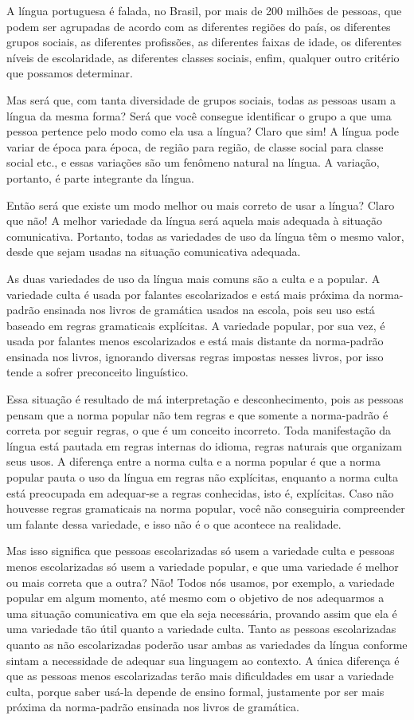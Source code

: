 A língua portuguesa é falada, no Brasil, por mais de 200 milhões de
pessoas, que podem ser agrupadas de acordo com as diferentes regiões do
país, os diferentes grupos sociais, as diferentes profissões, as
diferentes faixas de idade, os diferentes níveis de escolaridade, as
diferentes classes sociais, enfim, qualquer outro critério que possamos
determinar.

Mas será que, com tanta diversidade de grupos sociais, todas as pessoas
usam a língua da mesma forma? Será que você consegue identificar o grupo
a que uma pessoa pertence pelo modo como ela usa a língua? Claro que
sim! A língua pode variar de época para época, de região para região, de
classe social para classe social etc., e essas variações são um fenômeno
natural na língua. A variação, portanto, é parte integrante da língua.

Então será que existe um modo melhor ou mais correto de usar a língua?
Claro que não! A melhor variedade da língua será aquela mais adequada à
situação comunicativa. Portanto, todas as variedades de uso da língua
têm o mesmo valor, desde que sejam usadas na situação comunicativa
adequada.

As duas variedades de uso da língua mais comuns são a culta e a popular.
A variedade culta é usada por falantes escolarizados e está mais próxima
da norma-padrão ensinada nos livros de gramática usados na escola, pois
seu uso está baseado em regras gramaticais explícitas. A variedade
popular, por sua vez, é usada por falantes menos escolarizados e está
mais distante da norma-padrão ensinada nos livros, ignorando diversas
regras impostas nesses livros, por isso tende a sofrer preconceito
linguístico.

Essa situação é resultado de má interpretação e desconhecimento, pois as
pessoas pensam que a norma popular não tem regras e que somente a
norma-padrão é correta por seguir regras, o que é um conceito incorreto.
Toda manifestação da língua está pautada em regras internas do idioma,
regras naturais que organizam seus usos. A diferença entre a norma culta
e a norma popular é que a norma popular pauta o uso da língua em regras
não explícitas, enquanto a norma culta está preocupada em adequar-se a
regras conhecidas, isto é, explícitas. Caso não houvesse regras
gramaticais na norma popular, você não conseguiria compreender um
falante dessa variedade, e isso não é o que acontece na realidade.

Mas isso significa que pessoas escolarizadas só usem a variedade culta e
pessoas menos escolarizadas só usem a variedade popular, e que uma
variedade é melhor ou mais correta que a outra? Não! Todos nós usamos,
por exemplo, a variedade popular em algum momento, até mesmo com o
objetivo de nos adequarmos a uma situação comunicativa em que ela seja
necessária, provando assim que ela é uma variedade tão útil quanto a
variedade culta. Tanto as pessoas escolarizadas quanto as não
escolarizadas poderão usar ambas as variedades da língua conforme sintam
a necessidade de adequar sua linguagem ao contexto. A única diferença é
que as pessoas menos escolarizadas terão mais dificuldades em usar a
variedade culta, porque saber usá-la depende de ensino formal,
justamente por ser mais próxima da norma-padrão ensinada nos livros de
gramática.

